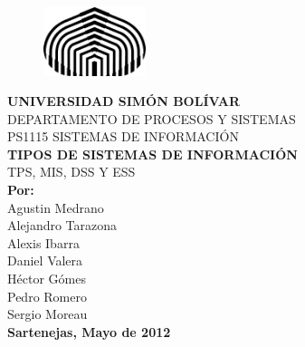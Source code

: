 \thispagestyle{empty}
\begin{center}
\begin{figure}[htb]
\begin{center}
\includegraphics[width=3cm]{logoUSB}
\end{center}
\end{figure}

\textbf {\Large UNIVERSIDAD SIMÓN BOLÍVAR}\\
DEPARTAMENTO DE PROCESOS Y SISTEMAS\\
PS1115 SISTEMAS DE INFORMACIÓN \\
[6cm]
\textbf {\large TIPOS DE SISTEMAS DE INFORMACIÓN} \\ 
TPS, MIS, DSS Y ESS\\
[3cm]
\textbf {Por:}\\
Agustin Medrano\\
Alejandro Tarazona\\
Alexis Ibarra\\
Daniel Valera\\
Héctor Gómes\\
Pedro Romero\\
Sergio Moreau\\
[3.5cm]
\textbf {Sartenejas, Mayo de 2012}
\end{center} 
